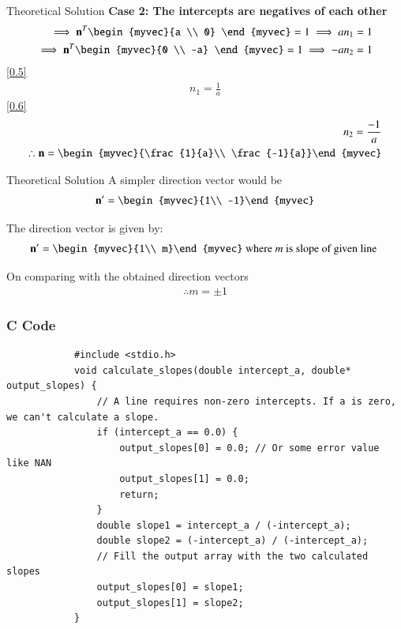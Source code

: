 \documentclass{beamer}
\begin{document}
		\begin{frame}{Theoretical Solution}
		\textbf{Case 2: The intercepts are negatives of each other }
		\begin{align}
			\implies  \vec{n}^T\begin{myvec}{a \\ 0} \end{myvec} = 1 \implies an_1 = 1 \label{0.5}\\
			\implies \vec{n}^T\begin{myvec}{0 \\ -a} \end{myvec} =1\implies -an_2 = 1 \label{0.6} \\
		\end{align}
		\eqref{0.5}
		\begin{align}
			n_1 = \frac{1}{a} 
		\end{align}
		\eqref{0.6}
		\begin{align}
			n_2 = \frac{-1}{a} \\
			\therefore \vec{n} = \begin{myvec}{\frac{1}{a}\\ \frac{-1}{a}}\end{myvec}
		\end{align}
	\end{frame}
		\begin{frame}{Theoretical Solution}
		A simpler direction vector would be
		\begin{align}
			\vec{n'} = 	\begin{myvec}{1\\ -1}\end{myvec}
		\end{align}
		
		The direction vector is given  by:
		\begin{align}
			\vec{n'} = 	\begin{myvec}{1\\ m}\end{myvec} \text{  where $m$ is slope of given line }
		\end{align}
		
		On comparing with the obtained direction vectors
		\begin{align}
			\therefore m = \pm1
		\end{align}
		\end{frame}
	
	\begin{frame}[fragile]
		\frametitle{C Code}
		
		\begin{lstlisting}
			#include <stdio.h>
			void calculate_slopes(double intercept_a, double* output_slopes) {
				// A line requires non-zero intercepts. If a is zero, we can't calculate a slope.
				if (intercept_a == 0.0) {
					output_slopes[0] = 0.0; // Or some error value like NAN
					output_slopes[1] = 0.0;
					return;
				}
				double slope1 = intercept_a / (-intercept_a);
				double slope2 = (-intercept_a) / (-intercept_a);
				// Fill the output array with the two calculated slopes
				output_slopes[0] = slope1;
				output_slopes[1] = slope2;
			}
		\end{lstlisting}
	\end{frame}
	
\end{document}
